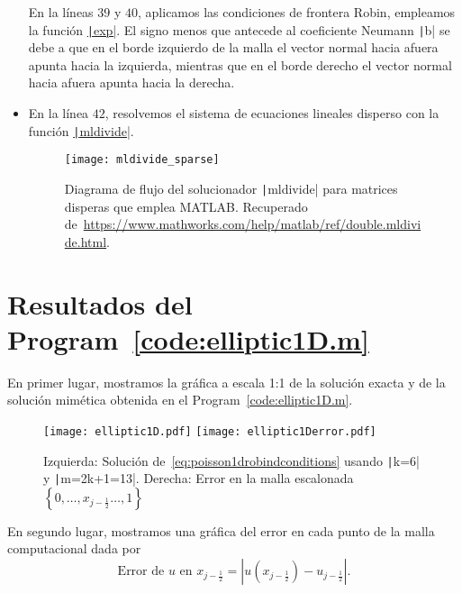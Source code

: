 \begin{itemize}
	      En la líneas $39$ y $40$, aplicamos las condiciones de
	      frontera Robin, empleamos la función
	      \href{https://docs.octave.org/latest/Exponents-and-Logarithms.html#XREFexp}{\texttt|exp|}.
	      El signo menos que antecede al coeficiente Neumann
	      \texttt|b| se debe a que en el borde izquierdo
	      de la malla el vector normal hacia afuera apunta hacia la
	      izquierda, mientras que en el borde derecho el vector
	      normal hacia afuera apunta hacia la derecha.

	\item

	      En la línea $42$, resolvemos el sistema de ecuaciones lineales
	      disperso con la función \href{https://docs.octave.org/latest/Arithmetic-Ops.html#index-mldivide}{\texttt|mldivide|}.

	      \begin{figure}[ht!]
		      \centering
		      \texttt{[image: mldivide\_sparse]}
		      \caption{Diagrama de flujo del solucionador
			      \texttt|mldivide| para matrices
			      disperas que emplea MATLAB.
			      Recuperado de~\url{https://www.mathworks.com/help/matlab/ref/double.mldivide.html}.}
	      \end{figure}
\end{itemize}

\section*{Resultados del Program~\ref{code:elliptic1D.m}}

En primer lugar, mostramos la gráfica a escala 1:1 de la solución
exacta y de la solución mimética obtenida en el Program~\ref{code:elliptic1D.m}.

\begin{figure}[ht!]
	\centering
	\texttt{[image: elliptic1D.pdf]}
	\texttt{[image: elliptic1Derror.pdf]}
	\caption{Izquierda: Solución de~\eqref{eq:poisson1drobindconditions}
		usando \texttt|k=6| y \texttt|m=2k+1=13|.
		Derecha: Error en la malla escalonada
		\begin{math}
			\left\{
			0,
			\dotsc,
			x_{j-\frac{1}{2}}
			\dotsc,
			1
			\right\}
		\end{math}}
\end{figure}

En segundo lugar, mostramos una gráfica del error en cada punto de la malla computacional
dada por
\begin{equation*}
	\text{Error de $u$ en $x_{j-\frac{1}{2}}$}=
	\left|
	u\left(x_{j-\frac{1}{2}}\right)-
	u_{j-\frac{1}{2}}
	\right|.
\end{equation*}

